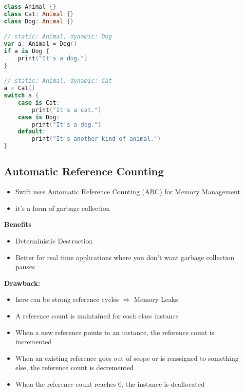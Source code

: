 \begin{breakbox}

\begin{lstlisting}[language=swift]
class Animal {}
class Cat: Animal {}
class Dog: Animal {}

// static: Animal, dynamic: Dog
var a: Animal = Dog()     
if a is Dog {
    print("It's a dog.")
}

// static: Animal, dynamic: Cat
a = Cat()     
switch a {
    case is Cat:
        print("It's a cat.")
    case is Dog:
        print("It's a dog.")
    default:
        print("It's another kind of animal.")
}
\end{lstlisting}
\end{breakbox}


\subsection{Automatic Reference Counting}

\begin{breakbox}

\begin{itemize}
\tightlist
\item
  Swift uses Automatic Reference Counting (ARC) for Memory Management
\item
  it's a form of garbage collection
\end{itemize}

\end{breakbox}

\begin{breakbox}

\textbf{Benefits}
\begin{itemize}
\tightlist
\item
  Deterministic Destruction
\item
  Better for real time applications where you don't want garbage
  collection pauses
\end{itemize}

\textbf{Drawback:}
\begin{itemize}
\tightlist
\item
  here can be strong reference cycles $\Rightarrow$ Memory Leaks
\end{itemize}
\end{breakbox}

\columnbreak
\begin{breakbox}

\begin{itemize}
\tightlist
\item
  A reference count is maintained for each class instance
\item
  When a new reference points to an instance, the reference count is
  incremented
\item
  When an existing reference goes out of scope or is reassigned to
  something else, the reference count is decremented
\item
  When the reference count reaches 0, the instance is deallocated
\end{itemize}
\end{breakbox}

